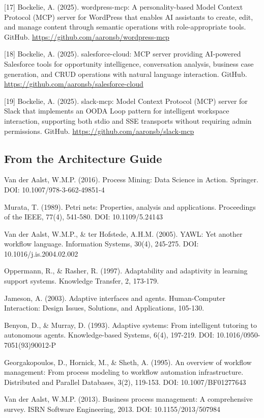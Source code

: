 \documentclass[11pt,a4paper]{article}
\begin{document}
[17] Bockelie, A. (2025). wordpress-mcp: A personality-based Model Context Protocol (MCP) server for WordPress that enables AI assistants to create, edit, and manage content through semantic operations with role-appropriate tools. GitHub. \url{https://github.com/aaronsb/wordpress-mcp}

[18] Bockelie, A. (2025). salesforce-cloud: MCP server providing AI-powered Salesforce tools for opportunity intelligence, conversation analysis, business case generation, and CRUD operations with natural language interaction. GitHub. \url{https://github.com/aaronsb/salesforce-cloud}

[19] Bockelie, A. (2025). slack-mcp: Model Context Protocol (MCP) server for Slack that implements an OODA Loop pattern for intelligent workspace interaction, supporting both stdio and SSE transports without requiring admin permissions. GitHub. \url{https://github.com/aaronsb/slack-mcp}

\subsection*{From the Architecture Guide}

Van der Aalst, W.M.P. (2016). Process Mining: Data Science in Action. Springer. DOI: 10.1007/978-3-662-49851-4

Murata, T. (1989). Petri nets: Properties, analysis and applications. Proceedings of the IEEE, 77(4), 541-580. DOI: 10.1109/5.24143

Van der Aalst, W.M.P., \& ter Hofstede, A.H.M. (2005). YAWL: Yet another workflow language. Information Systems, 30(4), 245-275. DOI: 10.1016/j.is.2004.02.002

Oppermann, R., \& Rasher, R. (1997). Adaptability and adaptivity in learning support systems. Knowledge Transfer, 2, 173-179.

Jameson, A. (2003). Adaptive interfaces and agents. Human-Computer Interaction: Design Issues, Solutions, and Applications, 105-130.

Benyon, D., \& Murray, D. (1993). Adaptive systems: From intelligent tutoring to autonomous agents. Knowledge-based Systems, 6(4), 197-219. DOI: 10.1016/0950-7051(93)90012-P

Georgakopoulos, D., Hornick, M., \& Sheth, A. (1995). An overview of workflow management: From process modeling to workflow automation infrastructure. Distributed and Parallel Databases, 3(2), 119-153. DOI: 10.1007/BF01277643

Van der Aalst, W.M.P. (2013). Business process management: A comprehensive survey. ISRN Software Engineering, 2013. DOI: 10.1155/2013/507984
\end{document}
